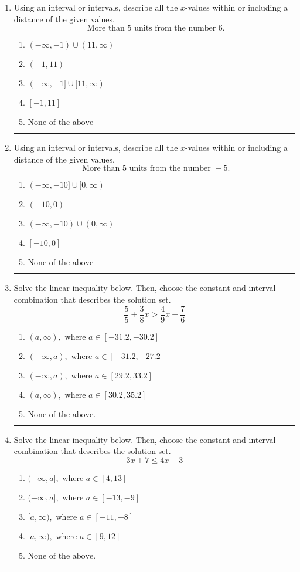 \documentclass[14pt]{extbook}
\newcommand{\litem}[1]{\item#1\hspace*{-1cm}\rule{\textwidth}{0.4pt}}
\begin{document}
\begin{enumerate}
{\begin{enumerate}[label=\Alph*.]
\end{enumerate} }
\litem{
Using an interval or intervals, describe all the $x$-values within or including a distance of the given values.\[ \text{ More than } 5 \text{ units from the number } 6. \]\begin{enumerate}[label=\Alph*.]
\item \( (-\infty, -1) \cup (11, \infty) \)
\item \( (-1, 11) \)
\item \( (-\infty, -1] \cup [11, \infty) \)
\item \( [-1, 11] \)
\item \( \text{None of the above} \)

\end{enumerate} }
\litem{
Using an interval or intervals, describe all the $x$-values within or including a distance of the given values.\[ \text{ More than } 5 \text{ units from the number } -5. \]\begin{enumerate}[label=\Alph*.]
\item \( (-\infty, -10] \cup [0, \infty) \)
\item \( (-10, 0) \)
\item \( (-\infty, -10) \cup (0, \infty) \)
\item \( [-10, 0] \)
\item \( \text{None of the above} \)

\end{enumerate} }
\litem{
Solve the linear inequality below. Then, choose the constant and interval combination that describes the solution set.\[ \frac{5}{5} + \frac{3}{8} x > \frac{4}{9} x - \frac{7}{6} \]\begin{enumerate}[label=\Alph*.]
\item \( (a, \infty), \text{ where } a \in [-31.2, -30.2] \)
\item \( (-\infty, a), \text{ where } a \in [-31.2, -27.2] \)
\item \( (-\infty, a), \text{ where } a \in [29.2, 33.2] \)
\item \( (a, \infty), \text{ where } a \in [30.2, 35.2] \)
\item \( \text{None of the above}. \)

\end{enumerate} }
\litem{
Solve the linear inequality below. Then, choose the constant and interval combination that describes the solution set.\[ 3x + 7 \leq 4x -3 \]\begin{enumerate}[label=\Alph*.]
\item \( (-\infty, a], \text{ where } a \in [4, 13] \)
\item \( (-\infty, a], \text{ where } a \in [-13, -9] \)
\item \( [a, \infty), \text{ where } a \in [-11, -8] \)
\item \( [a, \infty), \text{ where } a \in [9, 12] \)
\item \( \text{None of the above}. \)

\end{enumerate} }
\end{enumerate}
\end{document}
